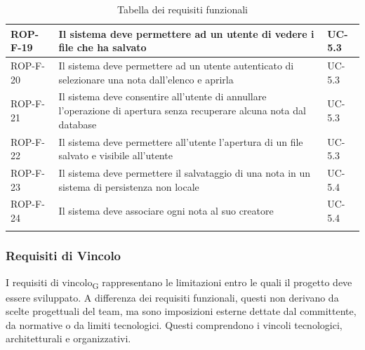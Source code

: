 \documentclass[11pt,a4paper]{article}
\begin{document}
\begin{longtable}{|p{}|>{\raggedright\arraybackslash}p{}|p{}|}
\hline
ROP-F-19 & Il sistema deve permettere ad un utente di vedere i file che ha salvato & UC-5.3 \\
\hline
ROP-F-20 & Il sistema deve permettere ad un utente autenticato di selezionare una nota dall'elenco e aprirla & UC-5.3 \\
\hline
ROP-F-21 & Il sistema deve consentire all'utente di annullare l'operazione di apertura senza recuperare alcuna nota dal database & UC-5.3 \\
\hline
ROP-F-22 & Il sistema deve permettere all'utente l'apertura di un file salvato e visibile all'utente & UC-5.3 \\
\hline
ROP-F-23 & Il sistema deve permettere il salvataggio di una nota in un sistema di persistenza non locale & UC-5.4 \\
\hline
ROP-F-24 & Il sistema deve associare ogni nota al suo creatore & UC-5.4 \\
\hline
\addlinespace[1em]
\caption{Tabella dei requisiti funzionali}
\end{longtable}

\newpage
\subsubsection{Requisiti di Vincolo}
I requisiti di vincolo\textsubscript{G} rappresentano le limitazioni entro le quali il progetto deve essere sviluppato. A differenza dei requisiti funzionali, questi non derivano da scelte progettuali del team, ma sono imposizioni esterne dettate dal committente, da normative o da limiti tecnologici.
Questi comprendono i vincoli tecnologici, architetturali e organizzativi.
\end{document}

